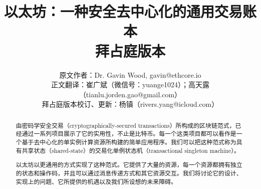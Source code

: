 \documentclass[9pt,oneside]{amsart}
\title{以太坊：一种安全去中心化的通用交易账本 \\ {\smaller \textbf{拜占庭版本 \YellowPaperVersionNumber}}}
\author{
    原文作者：Dr. Gavin Wood, gavin@ethcore.io\\
    正文翻译：崔广斌（微信号：yuange1024）；高天露（tianlu.jorden.gao@gmail.com） \\
    拜占庭版本校订、更新：杨镇（rivers.yang@icloud.com）
}
\begin{document}
\pagecolor{pagecolor}

\begin{abstract}
由密码学安全交易（cryptographically-secured transactions）所构成的区块链范式，已经通过一系列项目展示了它的实用性，不止是比特币。每一个这类项目都可以看作是一个基于去中心化的单实例计算资源所构建的简单应用程序。我们可以把这种范式称为具有共享状态（shared-state）的交易化单例状态机（transactional singleton machine）。

以太坊以更通用的方式实现了这种范式。它提供了大量的资源，每一个资源都拥有独立的状态和操作码，并且可以通过消息传递方式和其它资源交互。我们将讨论它的设计、实现上的问题、它所提供的机遇以及我们所设想的未来障碍。
\end{abstract}

\maketitle
\end{document}
